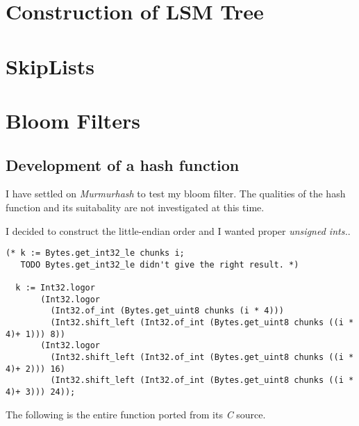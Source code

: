 \documentclass[../../../include/open-logic-chapter]{subfiles}
\begin{document}

\begin{abstract}
\end{abstract}
\newpage

	\section{ Construction of LSM Tree}
	\section{ SkipLists}
	\section{ Bloom Filters}

	\subsection{ Development of a hash function }

    I have settled on \textit{Murmurhash} to test my bloom filter.
    The qualities of the hash function and its suitabality are not investigated at this time.

I decided to construct the little-endian order and I wanted proper
\textit{unsigned ints.}.

			\begin{lstlisting}[style=ocamlstyle,caption={Create little-endian order by shifting 8-bit sequences.}]
  (* k := Bytes.get_int32_le chunks i;
   TODO Bytes.get_int32_le didn't give the right result. *)

  k := Int32.logor
       (Int32.logor
         (Int32.of_int (Bytes.get_uint8 chunks (i * 4)))
         (Int32.shift_left (Int32.of_int (Bytes.get_uint8 chunks ((i * 4)+ 1))) 8))
       (Int32.logor
         (Int32.shift_left (Int32.of_int (Bytes.get_uint8 chunks ((i * 4)+ 2))) 16)
         (Int32.shift_left (Int32.of_int (Bytes.get_uint8 chunks ((i * 4)+ 3))) 24));
			\end{lstlisting}

The following is the entire function ported from its \textit{C} source.
\end{document}
